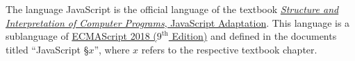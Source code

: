 The language JavaScript is the official language of the textbook
\href{https://sourceacademy.org/sicpjs/}{\color{DarkBlue}\emph{Structure and Interpretation
of Computer Programs}, JavaScript Adaptation}.
This language is a sublanguage of
\href{http://www.ecma-international.org/publications/files/ECMA-ST/Ecma-262.pdf}{\color{DarkBlue}
ECMAScript 2018 ($9^{\textrm{th}}$ Edition)}
and defined in the documents titled ``JavaScript \S $x$'', where $x$ refers to the
respective textbook chapter.
